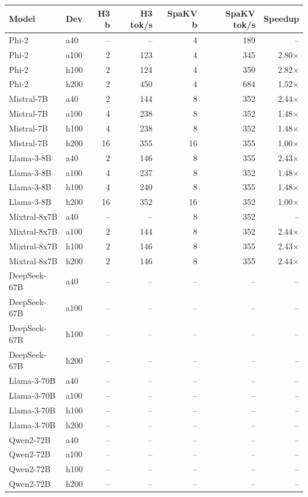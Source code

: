\begin{tabular}{llrrrrr}
\toprule
Model & Dev & H3 b & H3 tok/s & SpaKV b & SpaKV tok/s & Speedup\\
\midrule
Phi-2 & a40 & -- & -- & 4 & 189 & --\\
Phi-2 & a100 & 2 & 123 & 4 & 345 & 2.80$\times$\\
Phi-2 & h100 & 2 & 124 & 4 & 350 & 2.82$\times$\\
Phi-2 & h200 & 2 & 450 & 4 & 684 & 1.52$\times$\\
Mistral-7B & a40 & 2 & 144 & 8 & 352 & 2.44$\times$\\
Mistral-7B & a100 & 4 & 238 & 8 & 352 & 1.48$\times$\\
Mistral-7B & h100 & 4 & 238 & 8 & 352 & 1.48$\times$\\
Mistral-7B & h200 & 16 & 355 & 16 & 355 & 1.00$\times$\\
Llama-3-8B & a40 & 2 & 146 & 8 & 355 & 2.43$\times$\\
Llama-3-8B & a100 & 4 & 237 & 8 & 352 & 1.48$\times$\\
Llama-3-8B & h100 & 4 & 240 & 8 & 355 & 1.48$\times$\\
Llama-3-8B & h200 & 16 & 352 & 16 & 352 & 1.00$\times$\\
Mixtral-8x7B & a40 & -- & -- & 8 & 352 & --\\
Mixtral-8x7B & a100 & 2 & 144 & 8 & 352 & 2.44$\times$\\
Mixtral-8x7B & h100 & 2 & 146 & 8 & 355 & 2.43$\times$\\
Mixtral-8x7B & h200 & 2 & 146 & 8 & 355 & 2.44$\times$\\
DeepSeek-67B & a40 & -- & -- & -- & -- & --\\
DeepSeek-67B & a100 & -- & -- & -- & -- & --\\
DeepSeek-67B & h100 & -- & -- & -- & -- & --\\
DeepSeek-67B & h200 & -- & -- & -- & -- & --\\
Llama-3-70B & a40 & -- & -- & -- & -- & --\\
Llama-3-70B & a100 & -- & -- & -- & -- & --\\
Llama-3-70B & h100 & -- & -- & -- & -- & --\\
Llama-3-70B & h200 & -- & -- & -- & -- & --\\
Qwen2-72B & a40 & -- & -- & -- & -- & --\\
Qwen2-72B & a100 & -- & -- & -- & -- & --\\
Qwen2-72B & h100 & -- & -- & -- & -- & --\\
Qwen2-72B & h200 & -- & -- & -- & -- & --\\
\bottomrule
\end{tabular}
